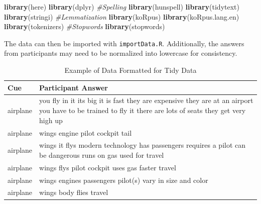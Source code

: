 \documentclass[man]{apa6}
\newenvironment{Shaded}{\begin{snugshade}}{\end{snugshade}}
\newcommand{\CommentTok}[1]{\textcolor[rgb]{0.56,0.35,0.01}{\textit{#1}}}
\newcommand{\DataTypeTok}[1]{\textcolor[rgb]{0.13,0.29,0.53}{#1}}
\newcommand{\KeywordTok}[1]{\textcolor[rgb]{0.13,0.29,0.53}{\textbf{#1}}}
\newcommand{\NormalTok}[1]{#1}
\newcommand{\OperatorTok}[1]{\textcolor[rgb]{0.81,0.36,0.00}{\textbf{#1}}}
\newcommand{\StringTok}[1]{\textcolor[rgb]{0.31,0.60,0.02}{#1}}
\begin{document}
\scriptsize

\begin{Shaded}
\begin{Highlighting}[]
\KeywordTok{library}\NormalTok{(here)}
\KeywordTok{library}\NormalTok{(dplyr)}
\CommentTok{#Spelling}
\KeywordTok{library}\NormalTok{(hunspell)}
\KeywordTok{library}\NormalTok{(tidytext)}
\KeywordTok{library}\NormalTok{(stringi)}
\CommentTok{#Lemmatization}
\KeywordTok{library}\NormalTok{(koRpus) }
\KeywordTok{library}\NormalTok{(koRpus.lang.en)}
\KeywordTok{library}\NormalTok{(tokenizers)}
\CommentTok{#Stopwords}
\KeywordTok{library}\NormalTok{(stopwords)}
\end{Highlighting}
\end{Shaded}

\normalsize

The data can then be imported with \texttt{importData.R}. Additionally, the answers from participants may need to be normalized into lowercase for consistency.

\scriptsize

\begin{Shaded}
\end{Shaded}

\normalsize

\begin{table}[t]

\caption{\label{tab:tab1}Example of Data Formatted for Tidy Data}
\centering
\begin{tabular}{l>{\raggedright\arraybackslash}p{30em}}
\toprule
Cue & Participant Answer\\
\midrule
airplane & you fly in it  its big  it is fast  they are expensive  they are at an airport  you have to be trained to fly it  there are lots of seats  they get very high up\\
airplane & wings engine pilot cockpit tail\\
airplane & wings  it flys  modern technology  has passengers  requires a pilot  can be dangerous  runs on gas  used for travel\\
airplane & wings  flys  pilot  cockpit  uses gas  faster travel\\
airplane & wings  engines  passengers  pilot(s)  vary in size and color\\
\addlinespace
airplane & wings  body  flies  travel\\
\bottomrule
\end{tabular}
\end{table}
\end{document}
